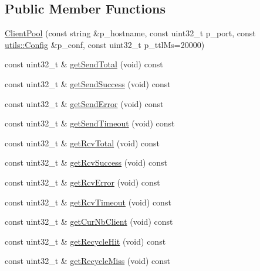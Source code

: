 \subsection*{Public Member Functions}
\begin{DoxyCompactItemize}
\item 
\hyperlink{classxtd_1_1network_1_1bip_1_1ClientPool_a19357fadc950be3b681e4c13b602b9ff}{Client\-Pool} (const string \&p\-\_\-hostname, const uint32\-\_\-t p\-\_\-port, const \hyperlink{classxtd_1_1network_1_1utils_1_1Config}{utils\-::\-Config} \&p\-\_\-conf, const uint32\-\_\-t p\-\_\-ttl\-Ms=20000)
\item 
const uint32\-\_\-t \& \hyperlink{classxtd_1_1network_1_1bip_1_1ClientPool_ac38bce359cae12634348f3baceb31668}{get\-Send\-Total} (void) const 
\item 
const uint32\-\_\-t \& \hyperlink{classxtd_1_1network_1_1bip_1_1ClientPool_ae744842f18c70979bf792d10fe799716}{get\-Send\-Success} (void) const 
\item 
const uint32\-\_\-t \& \hyperlink{classxtd_1_1network_1_1bip_1_1ClientPool_a48e713a842d7d5bf0c9142d4f65ab719}{get\-Send\-Error} (void) const 
\item 
const uint32\-\_\-t \& \hyperlink{classxtd_1_1network_1_1bip_1_1ClientPool_a65c430ef8ee5a65ec6289ea554df9ccf}{get\-Send\-Timeout} (void) const 
\item 
const uint32\-\_\-t \& \hyperlink{classxtd_1_1network_1_1bip_1_1ClientPool_aae35b25fd8d491a7b4e42dcb3b00dbc8}{get\-Rcv\-Total} (void) const 
\item 
const uint32\-\_\-t \& \hyperlink{classxtd_1_1network_1_1bip_1_1ClientPool_a118010103ded46a9d997765e74a9fddf}{get\-Rcv\-Success} (void) const 
\item 
const uint32\-\_\-t \& \hyperlink{classxtd_1_1network_1_1bip_1_1ClientPool_a44f712ba35d274fcb093c55f197539da}{get\-Rcv\-Error} (void) const 
\item 
const uint32\-\_\-t \& \hyperlink{classxtd_1_1network_1_1bip_1_1ClientPool_abdb1cb0ea47af82189a3df7e074ba123}{get\-Rcv\-Timeout} (void) const 
\item 
const uint32\-\_\-t \& \hyperlink{classxtd_1_1network_1_1bip_1_1ClientPool_a70de85e8b181bd82214bff2aa27600f1}{get\-Cur\-Nb\-Client} (void) const 
\item 
const uint32\-\_\-t \& \hyperlink{classxtd_1_1network_1_1bip_1_1ClientPool_a616b3398d55725cdf1cee89a9c7f1154}{get\-Recycle\-Hit} (void) const 
\item 
const uint32\-\_\-t \& \hyperlink{classxtd_1_1network_1_1bip_1_1ClientPool_a0432fecefc0e16d58581e71d9796a423}{get\-Recycle\-Miss} (void) const 

\end{DoxyCompactItemize}
